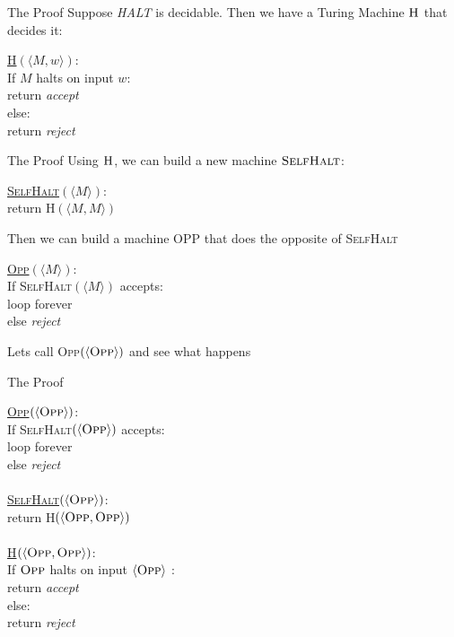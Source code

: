 \documentclass[aspectratio=169]{beamer}
\begin{document}
\begin{frame}{The Proof}
    Suppose \emph{HALT} is decidable. Then we have a Turing Machine $\textsc{H}$ that decides it:
    \begin{algo}
        \underline{\textsc{H}$(\langle M, w \rangle)$}:\+
    \\      If $M$ halts on input $w$:\+
    \\          return \emph{accept}\-
    \\      else:\+
    \\          return \emph{reject}
    \end{algo}
\end{frame}

\begin{frame}{The Proof}
    Using $\textsc{H}$, we can build a new machine $\textsc{SelfHalt}$:
    \begin{algo}
        \underline{\textsc{SelfHalt}$(\langle M \rangle)$}:\+
    \\      return \textsc{H}$(\langle M, M \rangle)$
    \end{algo} \pause
    
    Then we can build a machine \textsc{OPP} that does the opposite of \textsc{SelfHalt}
    \begin{algo}
        \underline{\textsc{Opp}$(\langle M \rangle)$}:\+
    \\      If \textsc{SelfHalt}$(\langle M \rangle)$ accepts:\+
    \\          loop forever\-
    \\      else \emph{reject}
    \end{algo} \pause
    
    Lets call \textsc{Opp}$(\langle \textsc{Opp} \rangle)$ and see what happens

\end{frame}

\begin{frame}{The Proof}
    \begin{algo}
        {\color{sigma@alertred} \underline{\textsc{Opp}$(\langle \textsc{Opp} \rangle)$}}:\+
    \\      If \textsc{SelfHalt}$(\langle \textsc{Opp} \rangle)$ accepts:\+
    \\          loop forever\-
    \\      else \emph{reject}\-
    \\
    \\  \underline{\textsc{SelfHalt}$(\langle \textsc{Opp} \rangle)$}:\+
    \\      return \textsc{H}$(\langle \textsc{Opp}, \textsc{Opp} \rangle)$\-
    \\
    \\  \underline{\textsc{H}$(\langle \textsc{Opp}, \textsc{Opp} \rangle)$}:\+
    \\      {\color{sigma@alertred} If $\textsc{Opp}$ halts on input $\langle \textsc{Opp} \rangle$ }:\+
    \\          return \emph{accept}\-
    \\      else:\+
    \\          return \emph{reject}
    \end{algo}
\end{frame}
\end{document}
